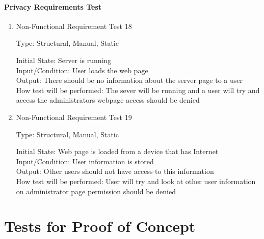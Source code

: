 \documentclass[12pt, titlepage]{article}
\begin{document}
\paragraph{Privacy Requirements Test}

\begin{enumerate}


\item{Non-Functional Requirement Test 18\\}

Type: Structural, Manual, Static
					
Initial State: Server is running \\
					
Input/Condition: User loads the web page  \\
					
Output: There should be no information about the server page to a user \\
					
How test will be performed: The sever will be running and a user will try and access the administrators webpage access should be denied \\

\item{Non-Functional Requirement Test 19\\}

Type: Structural, Manual, Static
					
Initial State: Web page is loaded from a device that has Internet \\
					
Input/Condition: User information is stored \\
					
Output: Other users should not have access to this information \\
					
How test will be performed: User will try and look at other user information on administrator page permission should be denied  \\
\end{enumerate}





\section{Tests for Proof of Concept}
\end{document}

